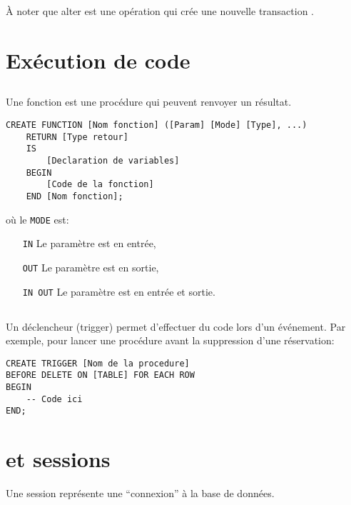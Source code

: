 \documentclass[10pt,a4paper,french]{article}
\begin{document}
À noter que \gls{alter} est une opération qui crée une nouvelle transaction .

\section{Exécution de code}

\subsection{}

\subsection{}

Une fonction est une procédure qui peuvent renvoyer un résultat.
\begin{verbatim}
CREATE FUNCTION [Nom fonction] ([Param] [Mode] [Type], ...)
    RETURN [Type retour]
    IS
        [Declaration de variables]
    BEGIN
        [Code de la fonction]
    END [Nom fonction];
\end{verbatim}
où le {\tt MODE} est:
\begin{itemize}
\item[\tt IN] Le paramètre est en entrée,
\item[\tt OUT] Le paramètre est en sortie,
\item[\tt IN OUT] Le paramètre est en entrée et sortie.
\end{itemize}

\subsection{}

Un déclencheur (trigger) permet d'effectuer du code lors d'un événement. Par exemple, pour lancer une procédure avant la suppression d'une réservation:
\begin{verbatim}
CREATE TRIGGER [Nom de la procedure]
BEFORE DELETE ON [TABLE] FOR EACH ROW
BEGIN
    -- Code ici
END;
\end{verbatim}

\section{ et sessions}\label{transaction}

Une session représente une ``connexion'' à la base de données.
\end{document}
